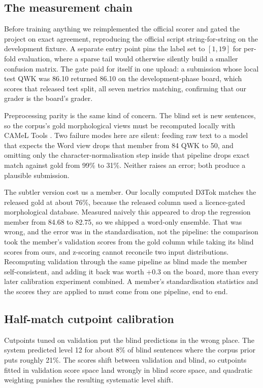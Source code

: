\documentclass[11pt]{article}
\begin{document}
\subsection{The measurement chain}

Before training anything we reimplemented the official scorer and gated the project on exact
agreement, reproducing the official script string-for-string on the development fixture. A
separate entry point pins the label set to $[1,19]$ for per-fold evaluation, where a sparse
tail would otherwise silently build a smaller confusion matrix. The gate paid for itself in one
upload: a submission whose local test QWK was 86.10 returned 86.10 on the development-phase
board, which scores that released test split, all seven metrics matching, confirming that our
grader is the board's grader.

Preprocessing parity is the same kind of concern. The blind set is new sentences, so the
corpus's gold morphological views must be recomputed locally with
CAMeL Tools \citep{obeid-etal-2020-camel}. Two failure modes here are silent: feeding raw
text to a model that expects the Word view drops that member from 84 QWK to 50, and omitting
only the character-normalisation step inside that pipeline drops exact match against gold
from 99\% to 31\%. Neither raises an error; both produce a plausible submission.

The subtler version cost us a member. Our locally computed D3Tok matches the released gold
at about 76\%, because the released column used a licence-gated morphological database.
Measured naively this appeared to drop the regression member from 84.68 to 82.75, so we
shipped a word-only ensemble. That was wrong, and the error was in the standardisation, not the
pipeline: the comparison took the member's validation scores from the gold column while taking
its blind scores from ours, and z-scoring cannot reconcile two input distributions. Recomputing
validation through the same pipeline as blind made the member self-consistent, and adding it
back was worth +0.3 on the board, more than every later calibration experiment combined. A
member's standardisation statistics and the scores they are applied to must come from one
pipeline, end to end.

\subsection{Half-match cutpoint calibration}

Cutpoints tuned on validation put the blind predictions in the wrong place. The system
predicted level 12 for about 8\% of blind sentences where the corpus prior puts roughly 21\%.
The scores shift between validation and blind, so cutpoints fitted in validation score space
land wrongly in blind score space, and quadratic weighting punishes the resulting systematic
level shift.
\end{document}
